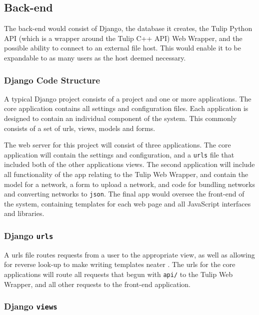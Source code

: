 \documentclass[../dissertation.tex]{subfiles}
\begin{document}
\subsection{Back-end}
\label{sec:overview-backend}

The back-end would consist of Django, the database it creates, the Tulip Python API (which is a wrapper around the Tulip C++ API) Web Wrapper, and the possible ability to connect to an external file host. This would enable it to be expandable to as many users as the host deemed necessary.

\subsubsection{Django Code Structure}

A typical Django project consists of a project and one or more applications. The core application contains all settings and configuration files. Each application is designed to contain an individual component of the system. This commonly consists of a set of urls, views, models and forms. 

The web server for this project will consist of three applications. The core application will contain the settings and configuration, and a \texttt{urls} file that included both of the other applications views. The second application will include all functionality of the app relating to the Tulip Web Wrapper, and contain the model for a network, a form to upload a network, and code for bundling networks and converting networks to \texttt{json}. The final app would oversee the front-end of the system, containing templates for each web page and all JavaScript interfaces and libraries.

\subsubsection{Django \texttt{urls}}

A urls file routes requests from a user to the appropriate view, as well as allowing for reverse look-up to make writing templates neater \cite{django-docs-urls}. The urls for the core applications will route all requests that begun with \texttt{api/} to the Tulip Web Wrapper, and all other requests to the front-end application. 

\subsubsection{Django \texttt{views}}
\end{document}
